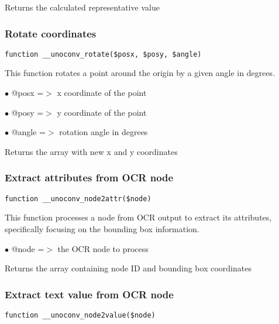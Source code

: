 \documentclass[a4paper]{article}
\begin{document}
Returns the calculated representative value

\hypertarget{toc541}{}
\subsubsection{Rotate coordinates}

\begin{lstlisting}
function __unoconv_rotate($posx, $posy, $angle)
\end{lstlisting}

This function rotates a point around the origin by a given angle in degrees.

\begin{compactitem}
\item[\color{myblue}$\bullet$] @posx  =$>$ x coordinate of the point
\item[\color{myblue}$\bullet$] @posy  =$>$ y coordinate of the point
\item[\color{myblue}$\bullet$] @angle =$>$ rotation angle in degrees
\end{compactitem}

Returns the array with new x and y coordinates

\hypertarget{toc542}{}
\subsubsection{Extract attributes from OCR node}

\begin{lstlisting}
function __unoconv_node2attr($node)
\end{lstlisting}

This function processes a node from OCR output to extract its attributes,
specifically focusing on the bounding box information.

\begin{compactitem}
\item[\color{myblue}$\bullet$] @node =$>$ the OCR node to process
\end{compactitem}

Returns the array containing node ID and bounding box coordinates

\hypertarget{toc543}{}
\subsubsection{Extract text value from OCR node}

\begin{lstlisting}
function __unoconv_node2value($node)
\end{lstlisting}
\end{document}
